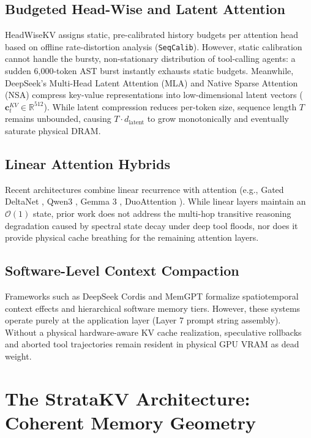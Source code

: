 \documentclass[11pt,letterpaper]{article}
\theoremstyle{definition}
\begin{document}
\subsection{Budgeted Head-Wise and Latent Attention}
HeadWiseKV \cite{xie2026headwisekv} assigns static, pre-calibrated history budgets per attention head based on offline rate-distortion analysis (\texttt{SeqCalib}). However, static calibration cannot handle the bursty, non-stationary distribution of tool-calling agents: a sudden 6,000-token AST burst instantly exhausts static budgets. Meanwhile, DeepSeek's Multi-Head Latent Attention (MLA) \cite{deepseek2025mla} and Native Sparse Attention (NSA) \cite{deepseek2025nsa} compress key-value representations into low-dimensional latent vectors ($\mathbf{c}_t^{KV} \in \mathbb{R}^{512}$). While latent compression reduces per-token size, sequence length $T$ remains unbounded, causing $T \cdot d_{\text{latent}}$ to grow monotonically and eventually saturate physical DRAM.

\subsection{Linear Attention Hybrids}
Recent architectures combine linear recurrence with attention (e.g., Gated DeltaNet \cite{yang2024deltanet}, Qwen3 \cite{qwen2026}, Gemma 3 \cite{gemma2025}, DuoAttention \cite{xiao2024duoattention}). While linear layers maintain an $\mathcal{O}(1)$ state, prior work does not address the multi-hop transitive reasoning degradation caused by spectral state decay under deep tool floods, nor does it provide physical cache breathing for the remaining attention layers.

\subsection{Software-Level Context Compaction}
Frameworks such as DeepSeek Cordis \cite{shi2026cordis} and MemGPT \cite{packer2023memgpt} formalize spatiotemporal context effects and hierarchical software memory tiers. However, these systems operate purely at the application layer (Layer 7 prompt string assembly). Without a physical hardware-aware KV cache realization, speculative rollbacks and aborted tool trajectories remain resident in physical GPU VRAM as dead weight.

\section{The StrataKV Architecture: Coherent Memory Geometry}
\label{sec:stratakv}
\end{document}
